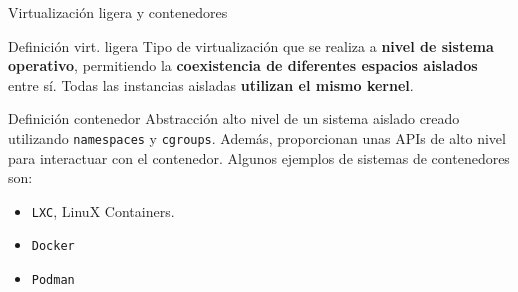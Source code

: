 \documentclass[aspectratio=169,xcolor=dvipsnames]{beamer}
\begin{document}
	\begin{frame}{Virtualización ligera y contenedores}
		\begin{block}{Definición virt. ligera}
		    Tipo de virtualización que se realiza a \textbf{nivel de sistema operativo}, permitiendo la \textbf{coexistencia de diferentes espacios aislados} entre sí. Todas las instancias aisladas \textbf{utilizan el mismo kernel}. 
		\end{block}
		
		\begin{block}{Definición contenedor}
		    Abstracción alto nivel de un sistema aislado creado utilizando \texttt{namespaces} y \texttt{cgroups}. Además, proporcionan unas APIs de alto nivel para interactuar con el contenedor. Algunos ejemplos de sistemas de contenedores son:
		    
		    \begin{itemize}
		        \item \texttt{LXC}, LinuX Containers.
		        \item \texttt{Docker}
		        \item \texttt{Podman}
		    \end{itemize}
		\end{block}
	\end{frame}
	
\end{document}
